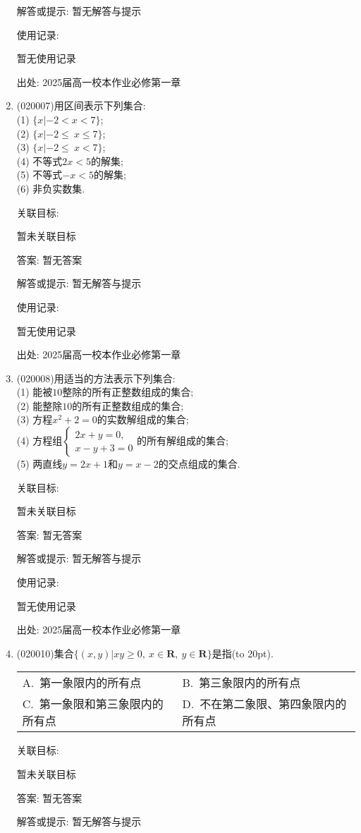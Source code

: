 \documentclass[10pt,a4paper]{article}
\newcommand{\bracket}[1]{(\hbox to #1pt{})}
\newcommand{\twoch}[4]{\par\begin{tabular}{p{.46\textwidth}p{.46\textwidth}}
A.~#1& B.~#2\\
C.~#3& D.~#4
\end{tabular}}
\begin{document}
\begin{enumerate}[1.]
解答或提示: 暂无解答与提示

使用记录:

暂无使用记录


出处: 2025届高一校本作业必修第一章
\item { (020007)}用区间表示下列集合:\\
(1) $\{x|-2<x<7\}$;\\
(2) $\{x|-2\le\ x\le7\}$;\\
(3) $\{x|-2\le\ x<7\}$;\\
(4) 不等式$2x<5$的解集;\\
(5) 不等式$-x<5$的解集; \\
(6) 非负实数集.


关联目标:

暂未关联目标

答案: 暂无答案

解答或提示: 暂无解答与提示

使用记录:

暂无使用记录


出处: 2025届高一校本作业必修第一章
\item { (020008)}用适当的方法表示下列集合:\\
(1) 能被$10$整除的所有正整数组成的集合;\\
(2) 能整除$10$的所有正整数组成的集合;\\
(3) 方程$x^2+2=0$的实数解组成的集合;\\
(4) 方程组$\begin{cases}2x+y=0, \\ x-y+3=0\end{cases}$的所有解组成的集合;\\
(5) 两直线$y=2x+1$和$y=x-2$的交点组成的集合.


关联目标:

暂未关联目标

答案: 暂无答案

解答或提示: 暂无解答与提示

使用记录:

暂无使用记录


出处: 2025届高一校本作业必修第一章
\item { (020010)}集合$\{(x, y)|xy\ge 0,\  x\in\mathbf{R},\  y\in\mathbf{R}\}$是指\bracket{20}.
\twoch{第一象限内的所有点}{第三象限内的所有点}{第一象限和第三象限内的所有点}{不在第二象限、第四象限内的所有点}


关联目标:

暂未关联目标

答案: 暂无答案

解答或提示: 暂无解答与提示


\end{enumerate}
\end{document}
